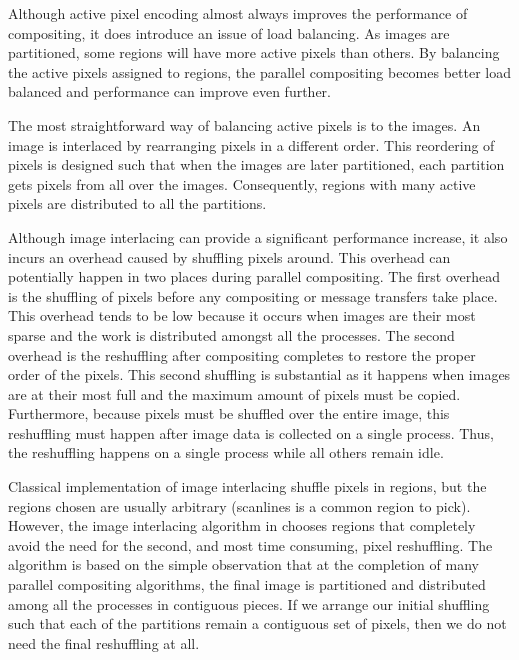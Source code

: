 Although active pixel encoding almost always improves the performance of
compositing, it does introduce an issue of load balancing.  As images are
partitioned, some regions will have more active pixels than others.  By
balancing the active pixels assigned to regions, the parallel compositing
becomes better load balanced and performance can improve even further.

The most straightforward way of balancing active pixels is to
 the images.  An image is interlaced by rearranging
pixels in a different order.  This reordering of pixels is designed such
that when the images are later partitioned, each partition gets pixels from
all over the images.  Consequently, regions with many active pixels are
distributed to all the partitions.

Although image interlacing can provide a significant performance increase,
it also incurs an overhead caused by shuffling pixels around.  This
overhead can potentially happen in two places during parallel compositing.
The first overhead is the shuffling of pixels before any compositing or
message transfers take place.  This overhead tends to be low because it
occurs when images are their most sparse and the work is distributed
amongst all the processes.  The second overhead is the reshuffling after
compositing completes to restore the proper order of the pixels.  This
second shuffling is substantial as it happens when images are at their most
full and the maximum amount of pixels must be copied.  Furthermore, because
pixels must be shuffled over the entire image, this reshuffling must happen
after image data is collected on a single process.  Thus, the reshuffling
happens on a single process while all others remain idle.

Classical implementation of image interlacing shuffle pixels in regions,
but the regions chosen are usually arbitrary (scanlines is a common region
to pick).  However, the image interlacing algorithm in \IceT chooses
regions that completely avoid the need for the second, and most time
consuming, pixel reshuffling.  The algorithm is based on the simple
observation that at the completion of many parallel compositing algorithms,
the final image is partitioned and distributed among all the processes in
contiguous pieces.  If we arrange our initial shuffling such that each of
the partitions remain a contiguous set of pixels, then we do not need the
final reshuffling at all.

